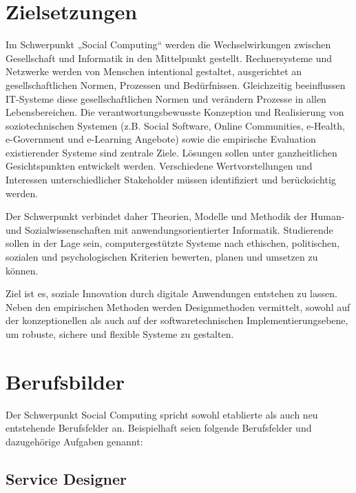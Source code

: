 \section*{Zielsetzungen\label{/mi-2017/modulbeschreibungen-master/schwerpunkt-soziotechnische-systeme}}\label{zielsetzungenpathlabelmi-2017modulbeschreibungen-masterschwerpunkt-soziotechnische-systeme}

Im Schwerpunkt „Social Computing`` werden die Wechselwirkungen zwischen
Gesellschaft und Informatik in den Mittelpunkt gestellt. Rechnersysteme
und Netzwerke werden von Menschen intentional gestaltet, ausgerichtet an
gesellschaftlichen Normen, Prozessen und Bedürfnissen. Gleichzeitig
beeinflussen IT-Systeme diese gesellschaftlichen Normen und verändern
Prozesse in allen Lebensbereichen. Die verantwortungsbewusste Konzeption
und Realisierung von soziotechnischen Systemen (z.B. Social Software,
Online Communities, e-Health, e-Government und e-Learning Angebote)
sowie die empirische Evaluation existierender Systeme sind zentrale
Ziele. Lösungen sollen unter ganzheitlichen Gesichtspunkten entwickelt
werden. Verschiedene Wertvorstellungen und Interessen unterschiedlicher
Stakeholder müssen identifiziert und berücksichtig werden.

Der Schwerpunkt verbindet daher Theorien, Modelle und Methodik der
Human- und Sozialwissenschaften mit anwendungsorientierter Informatik.
Studierende sollen in der Lage sein, computergestützte Systeme nach
ethischen, politischen, sozialen und psychologischen Kriterien bewerten,
planen und umsetzen zu können.

Ziel ist es, soziale Innovation durch digitale Anwendungen entstehen zu
lassen. Neben den empirischen Methoden werden Designmethoden vermittelt,
sowohl auf der konzeptionellen als auch auf der softwaretechnischen
Implementierungsebene, um robuste, sichere und flexible Systeme zu
gestalten.

\section*{Berufsbilder\label{/mi-2017/modulbeschreibungen-master/schwerpunkt-soziotechnische-systeme}}\label{berufsbilderpathlabelmi-2017modulbeschreibungen-masterschwerpunkt-soziotechnische-systeme}

Der Schwerpunkt Social Computing spricht sowohl etablierte als auch neu
entstehende Berufsfelder an. Beispielhaft seien folgende Berufsfelder
und dazugehörige Aufgaben genannt:

\subsection*{Service
Designer\label{/mi-2017/modulbeschreibungen-master/schwerpunkt-soziotechnische-systeme}}\label{service-designerpathlabelmi-2017modulbeschreibungen-masterschwerpunkt-soziotechnische-systeme}

